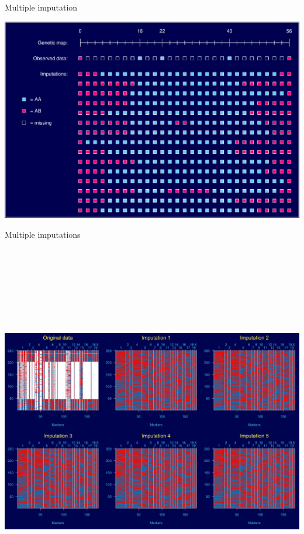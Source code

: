 \documentclass[12pt]{article}
\newcommand{\headsize}{\fontsize{35}{35} \selectfont}
\begin{document}
\newpage

\headsize \color{myyellow}
\hfill \begin{minipage}{5.75in}
\centering
Multiple imputation
\end{minipage}

\vfill

\centerline{\includegraphics{FigsA/imp.pdf}}


\newpage

\headsize \color{myyellow}
\hfill \begin{minipage}{5.75in}
\centering
Multiple imputations
\end{minipage}

\vfill

\centerline{\includegraphics[height=6.5in]{FigsA/multiimp.png}}
\end{document}
